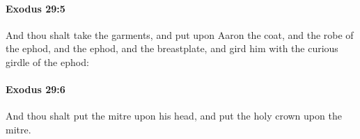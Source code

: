 		\paragraph{Exodus 29:5} %
			\label{EXODUS-29-5}

			And thou shalt take the garments, and put upon Aaron the coat, and the robe of the ephod, and the ephod, and the breastplate, and gird him with the curious girdle of the ephod:


		\paragraph{Exodus 29:6} %
			\label{EXODUS-29-6}

			And thou shalt put the mitre upon his head, and put the holy crown upon the mitre.


